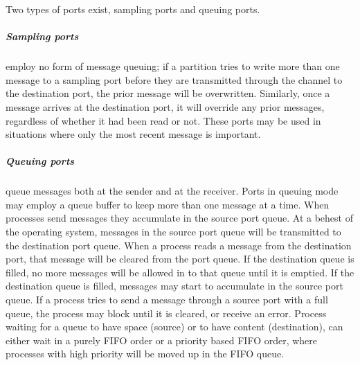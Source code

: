 Two types of ports exist, sampling ports and queuing ports.
\subparagraph{Sampling ports} employ no form of message queuing; if a partition tries to write more than one message to a sampling port
before they are transmitted through the channel to the destination port, the prior message will be overwritten. Similarly, once a message arrives at the destination port,
it will override any prior messages, regardless of whether it had been read or not. These ports may be used in situations where only the most recent message is important.
\subparagraph{Queuing ports} queue messages both at the sender and at the receiver. Ports in queuing mode may employ a queue buffer to keep more than one message at a time.
When processes send messages they accumulate in the source port queue. At a behest of the operating system, messages in the source port queue will be transmitted to the destination port queue.
When a process reads a message from the destination port, that message will be cleared from the port queue. If the destination queue is filled, no more messages will be allowed
in to that queue until it is emptied. If the destination queue is filled, messages may start to accumulate in the source port queue. If a process tries to send a message through a
source port with a full queue, the process may block until it is cleared, or receive an error.
Process waiting for a queue to have space (source) or to have content (destination), can either wait in a purely FIFO order or a priority based FIFO order, where processes with high priority
will be moved up in the FIFO queue.\\

